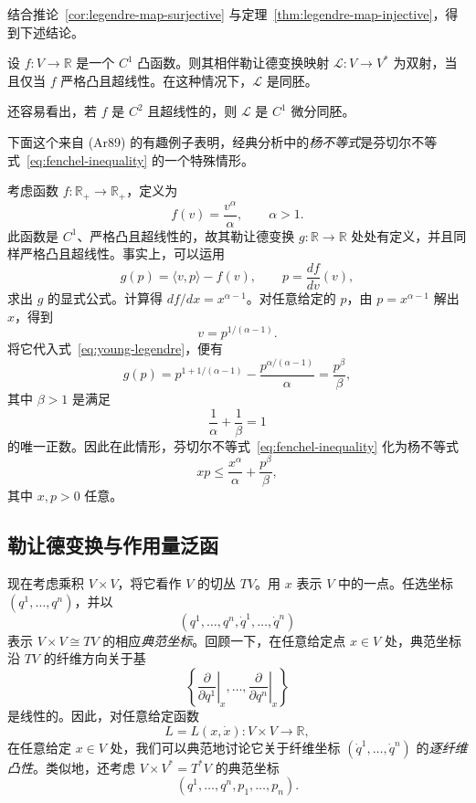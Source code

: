 结合推论~\ref{cor:legendre-map-surjective} 与定理~\ref{thm:legendre-map-injective}，得到下述结论。

\begin{corollary}[双射性]
\label{cor:legendre-map-bijective}
设 $f:V\to\mathbb R$ 是一个 $C^1$ 凸函数。则其相伴勒让德变换映射 $\mathcal L:V\to V^*$ 为双射，当且仅当 $f$ 严格凸且超线性。在这种情况下，$\mathcal L$ 是同胚。
\end{corollary}

还容易看出，若 $f$ 是 $C^2$ 且超线性的，则 $\mathcal L$ 是 $C^1$ 微分同胚。

下面这个来自 (Ar89) 的有趣例子表明，经典分析中的\emph{杨不等式}是芬切尔不等式~\eqref{eq:fenchel-inequality} 的一个特殊情形。

\begin{example}
\label{ex:young-inequality}
考虑函数 $f:\mathbb R_+\to\mathbb R_+$，定义为
\[
  f(v)=\frac{v^\alpha}{\alpha},\qquad\alpha>1.
\]
此函数是 $C^1$、严格凸且超线性的，故其勒让德变换 $g:\mathbb R\to\mathbb R$ 处处有定义，并且同样严格凸且超线性。事实上，可以运用
\begin{equation}\label{eq:young-legendre}
  g(p)=\langle v,p\rangle-f(v),
  \qquad p=\frac{df}{dv}(v),
\end{equation}
求出 $g$ 的显式公式。计算得 $df/dx=x^{\alpha-1}$。对任意给定的 $p$，由 $p=x^{\alpha-1}$ 解出 $x$，得到
\[
  v=p^{1/(\alpha-1)}.
\]
将它代入式~\eqref{eq:young-legendre}，便有
\[
  g(p)=p^{1+1/(\alpha-1)}-\frac{p^{\alpha/(\alpha-1)}}{\alpha}
  =\frac{p^\beta}{\beta},
\]
其中 $\beta>1$ 是满足
\[
  \frac1\alpha+\frac1\beta=1
\]
的唯一正数。因此在此情形，芬切尔不等式~\eqref{eq:fenchel-inequality} 化为杨不等式
\[
  xp\leq\frac{x^\alpha}{\alpha}+\frac{p^\beta}{\beta},
\]
其中 $x,p>0$ 任意。
\end{example}

\subsection{勒让德变换与作用量泛函}
\label{sec:legendre-transform-action-functional}

现在考虑乘积 $V\times V$，将它看作 $V$ 的切丛 $TV$。用 $x$ 表示 $V$ 中的一点。任选坐标 $(q^1,\ldots,q^n)$，并以
\[
  (q^1,\ldots,q^n,\dot q^1,\ldots,\dot q^n)
\]
表示 $V\times V\cong TV$ 的相应\emph{典范坐标}。回顾一下，在任意给定点 $x\in V$ 处，典范坐标沿 $TV$ 的纤维方向关于基
\[
  \left\{
    \left.\frac{\partial}{\partial q^1}\right|_x,
    \ldots,
    \left.\frac{\partial}{\partial q^n}\right|_x
  \right\}
\]
是线性的。因此，对任意给定函数
\[
  L=L(x,\dot x):V\times V\to\mathbb R,
\]
在任意给定 $x\in V$ 处，我们可以典范地讨论它关于纤维坐标 $(\dot q^1,\ldots,\dot q^n)$ 的\emph{逐纤维凸性}。类似地，还考虑 $V\times V^*=T^*V$ 的典范坐标
\[
  (q^1,\ldots,q^n,p_1,\ldots,p_n).
\]

